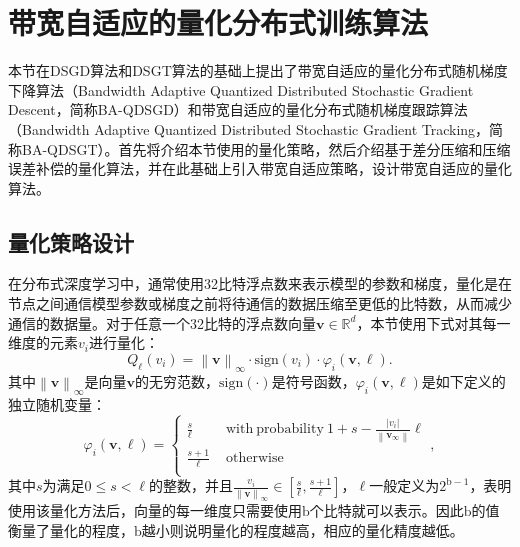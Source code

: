 \section{带宽自适应的量化分布式训练算法}
本节在DSGD算法和DSGT算法的基础上提出了带宽自适应的量化分布式随机梯度下降算法（Bandwidth Adaptive Quantized Distributed Stochastic Gradient Descent，简称BA-QDSGD）和带宽自适应的量化分布式随机梯度跟踪算法（Bandwidth Adaptive Quantized Distributed Stochastic Gradient Tracking，简称BA-QDSGT）。首先将介绍本节使用的量化策略，然后介绍基于差分压缩和压缩误差补偿的量化算法，并在此基础上引入带宽自适应策略，设计带宽自适应的量化算法。

\subsection{量化策略设计}
在分布式深度学习中，通常使用32比特浮点数来表示模型的参数和梯度，量化是在节点之间通信模型参数或梯度之前将待通信的数据压缩至更低的比特数，从而减少通信的数据量。对于任意一个32比特的浮点数向量$\boldsymbol{v}\in \mathbb{R} ^d$，本节使用下式对其每一维度的元素$v_i$进行量化：
\begin{equation}
    \label{tab:equ-4-5}
    Q_{\ell}\left( v_i \right) =\left\| \boldsymbol{v} \right\| _{\infty}\cdot \mathrm{sign}\left( v_i \right) \cdot \varphi _i(\boldsymbol{v},\ell ).
\end{equation}
其中$\left\| \boldsymbol{v} \right\| _{\infty}$是向量$\boldsymbol{v}$的无穷范数，$\mathrm{sign}\left( \cdot \right) $是符号函数，$\varphi _i(\boldsymbol{v},\ell )$是如下定义的独立随机变量：
\begin{equation}
    \label{tab:equ-4-6}
    \varphi _i(\boldsymbol{v},\ell )=\begin{cases}
        \frac{s}{\ell}&		\,\,\mathrm{with}\  \mathrm{probability}\  1+s-\frac{\left| v_i \right|}{\left\| \boldsymbol{v}_{\infty} \right\|}\ell\\
        \frac{s+1}{\ell}&		\,\,\mathrm{otherwise}\\
    \end{cases},
\end{equation}
其中$s$为满足$0\leqslant s<\ell $的整数，并且$\frac{v_i}{\left\| \boldsymbol{v} \right\| _{\infty}}\in \left[ \frac{s}{\ell},\frac{s+1}{\ell} \right] $，$\ell$一般定义为$2^{\mathrm{b}-1}$，表明使用该量化方法后，向量的每一维度只需要使用$\mathrm{b}$个比特就可以表示。因此$\mathrm{b}$的值衡量了量化的程度，$\mathrm{b}$越小则说明量化的程度越高，相应的量化精度越低。

